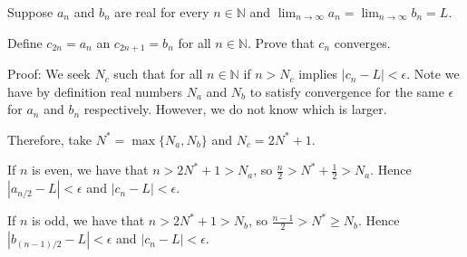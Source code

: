 \documentclass{article}
\begin{document}
Suppose $a_n$ and $b_n$ are real for every $n \in \mathbb{N}$ and $\lim_{n \rightarrow \infty} a_n = \lim_{n \rightarrow \infty} b_n = L$. 

Define $c_{2n} = a_n$ an $c_{2n+1} = b_n$ for all $n \in \mathbb{N}$. Prove that $c_n$ converges. 

Proof: We seek $N_c$ such that for all $n \in \mathbb{N}$ if $n > N_c$ implies $\left|c_n - L\right| < \epsilon$. 
Note we have by definition real numbers $N_a$ and $N_b$ to satisfy convergence for the same $\epsilon$ for $a_n$ and $b_n$ respectively. However, we do not know which is larger. 

Therefore, take $N^* = \max\{N_a, N_b\}$ and $N_c = 2N^* + 1$. 

If $n$ is even, we have that $n > 2N^* + 1 > N_a$, so $\frac{n}{2} > N^* + \frac{1}{2} > N_a$. Hence $\left|a_{n/2} - L\right| < \epsilon$ and $\left|c_n - L\right| < \epsilon$. 

If $n$ is odd, we have that $n > 2N^* + 1 > N_b$, so $\frac{n-1}{2} > N^* \geq  N_b$. Hence $\left|b_{(n-1)/2} - L\right| < \epsilon$ and $\left|c_n - L\right| < \epsilon$. 
\end{document}
